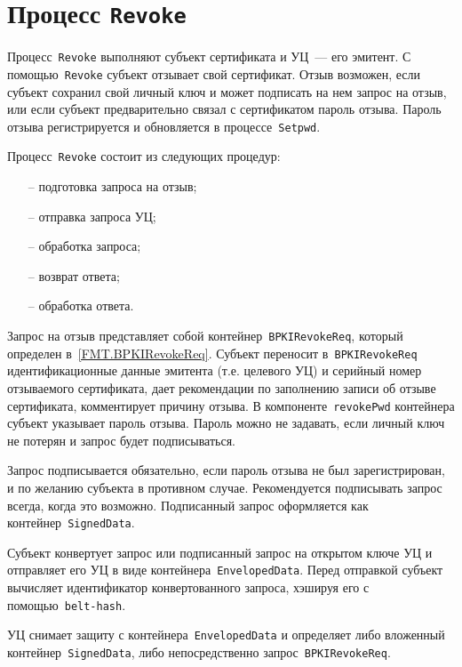\section{Процесс \texttt{Revoke}}\label{PROCESSES.Revoke}

Процесс~\texttt{Revoke} выполняют субъект сертификата и УЦ~---
его эмитент. С помощью~\texttt{Revoke} субъект отзывает свой сертификат.
Отзыв возможен, если субъект сохранил свой личный ключ и может подписать 
на нем запрос на отзыв, или если субъект предварительно связал с 
сертификатом пароль отзыва. Пароль отзыва регистрируется и обновляется
в процессе~\texttt{Setpwd}.


Процесс~\texttt{Revoke} состоит из следующих процедур:
\begin{itemize}
\item[--]
подготовка запроса на отзыв;
\item[--]
отправка запроса УЦ;
\item[--]
обработка запроса;
\item[--]
возврат ответа;
\item[--]
обработка ответа.
\end{itemize}

Запрос на отзыв представляет собой контейнер~\texttt{BPKIRevokeReq},
который определен в~\ref{FMT.BPKIRevokeReq}. Субъект переносит 
в~\texttt{BPKIRevokeReq} идентификационные данные эмитента (т.е. целевого 
УЦ) и серийный номер отзываемого сертификата, дает рекомендации по 
заполнению записи об отзыве сертификата, комментирует причину отзыва. В 
компоненте~\texttt{revokePwd} контейнера субъект указывает пароль отзыва. 
Пароль можно не задавать, если личный ключ не потерян и запрос будет 
подписываться.

Запрос подписывается обязательно, если пароль отзыва не был 
зарегистрирован, и по желанию субъекта в противном случае.
%
Рекомендуется подписывать запрос всегда, когда это возможно.
%
Подписанный запрос оформляется как контейнер~\texttt{SignedData}.

Субъект конвертует запрос или подписанный запрос на открытом ключе УЦ
и отправляет его УЦ в виде контейнера~\texttt{EnvelopedData}.
Перед отправкой субъект вычисляет идентификатор конвертованного запроса,
хэшируя его с помощью~\texttt{belt-hash}.

УЦ снимает защиту с контейнера~\texttt{EnvelopedData} и определяет 
либо вложенный контейнер~\texttt{SignedData}, либо непосредственно
запрос~\texttt{BPKIRevokeReq}.

